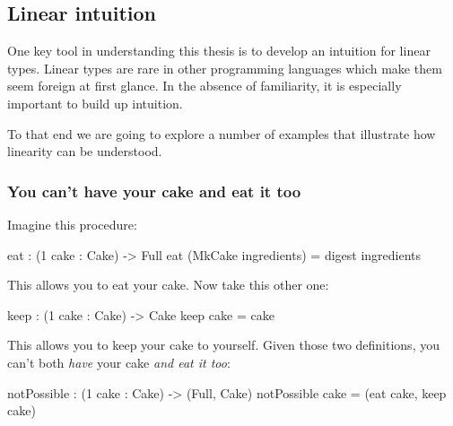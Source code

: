 \documentclass[
]{article}
\newenvironment{Shaded}{}{}
\newcommand{\DataTypeTok}[1]{\textcolor[rgb]{0.56,0.13,0.00}{#1}}
\newcommand{\DecValTok}[1]{\textcolor[rgb]{0.25,0.63,0.44}{#1}}
\newcommand{\NormalTok}[1]{#1}
\newcommand{\OperatorTok}[1]{\textcolor[rgb]{0.40,0.40,0.40}{#1}}
\newcommand{\OtherTok}[1]{\textcolor[rgb]{0.00,0.44,0.13}{#1}}
\begin{document}
\hypertarget{linear-intuition}{%
\subsection{Linear intuition}\label{linear-intuition}}

One key tool in understanding this thesis is to develop an intuition for
linear types. Linear types are rare in other programming languages which
make them seem foreign at first glance. In the absence of familiarity,
it is especially important to build up intuition.

To that end we are going to explore a number of examples that illustrate
how linearity can be understood.

\hypertarget{you-cant-have-your-cake-and-eat-it-too}{%
\subsubsection{You can't have your cake and eat it
too}\label{you-cant-have-your-cake-and-eat-it-too}}

Imagine this procedure:

\begin{Shaded}
\begin{Highlighting}[]
\NormalTok{eat }\OperatorTok{:}\NormalTok{ (}\DecValTok{1}\NormalTok{ cake }\OperatorTok{:} \DataTypeTok{Cake}\NormalTok{) }\OtherTok{{-}\textgreater{}} \DataTypeTok{Full}
\NormalTok{eat (}\DataTypeTok{MkCake}\NormalTok{ ingredients) }\OtherTok{=}\NormalTok{ digest ingredients}
\end{Highlighting}
\end{Shaded}

This allows you to eat your cake. Now take this other one:

\begin{Shaded}
\begin{Highlighting}[]
\NormalTok{keep }\OperatorTok{:}\NormalTok{ (}\DecValTok{1}\NormalTok{ cake }\OperatorTok{:} \DataTypeTok{Cake}\NormalTok{) }\OtherTok{{-}\textgreater{}} \DataTypeTok{Cake}
\NormalTok{keep cake }\OtherTok{=}\NormalTok{ cake}
\end{Highlighting}
\end{Shaded}

This allows you to keep your cake to yourself. Given those two
definitions, you can't both \emph{have} your cake \emph{and eat it too}:

\begin{Shaded}
\begin{Highlighting}[]
\NormalTok{notPossible }\OperatorTok{:}\NormalTok{ (}\DecValTok{1}\NormalTok{ cake }\OperatorTok{:} \DataTypeTok{Cake}\NormalTok{) }\OtherTok{{-}\textgreater{}}\NormalTok{ (}\DataTypeTok{Full}\NormalTok{, }\DataTypeTok{Cake}\NormalTok{)}
\NormalTok{notPossible cake }\OtherTok{=}\NormalTok{ (eat cake, keep cake)}
\end{Highlighting}
\end{Shaded}
\end{document}
